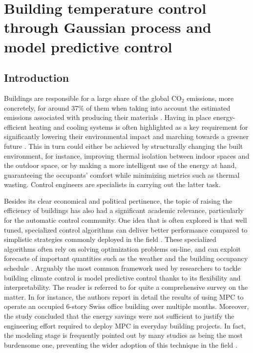 \cleardoublepage
\chapter{Building temperature control through Gaussian process and model predictive control}

\section{Introduction}

Buildings are responsible for a large share of the global CO$_2$ emissions, more concretely, for around 37\% of them when taking into account the estimated emissions associated with producing their materials \citep[§3.2]{united2022}. Having in place energy-efficient heating and cooling systems is often highlighted as a key requirement for significantly lowering their environmental impact and marching towards a greener future \citep{iea2022}. This in turn could either be achieved by structurally changing the built environment, for instance, improving thermal isolation between indoor spaces and the outdoor space, or by making a more intelligent use of the energy at hand, guaranteeing the occupants' comfort while minimizing metrics such as thermal wasting. Control engineers are specialists in carrying out the latter task.

Besides its clear economical and political pertinence, the topic of raising the efficiency of buildings has also had a significant academic relevance, particularly for the automatic control community. One idea that is often explored is that well tuned, specialized control algorithms can deliver better performance compared to simplistic strategies commonly deployed in the field \citep{stluka2018architectures}. These specialized algorithms often rely on solving optimization problems on-line, and can exploit forecasts of important quantities such as the weather and the building occupancy schedule \citep{oldewurtel2012use}. Arguably the most common framework used by researchers to tackle building climate control is model predictive control thanks to its flexibility and interpretability. The reader is referred to \cite{drgovna2020all} for quite a comprehensive survey on the matter. In \cite{sturzenegger2015model} for instance, the authors report in detail the results of using MPC to operate an occupied 6-story Swiss office building over multiple months. Moreover, the study concluded that the energy savings were not sufficient to justify the engineering effort required to deploy MPC in everyday building projects. In fact, the modeling stage is frequently pointed out by many studies as being the most burdensome one, preventing the wider adoption of this technique in the field \citep{drgovna2020all,bunning2020experimental}.

